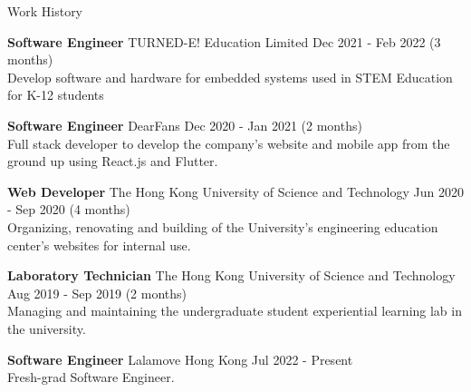 \documentclass{resume} %
\begin{document}
\begin{rSection}{Work History}
    \vspace{-1.25em}
    \item \textbf{Software Engineer} {TURNED-E! Education Limited} \hfill Dec 2021 - Feb 2022 (3 months) \\
    Develop software and hardware for embedded systems used in STEM Education for K-12 students
    \item \textbf{Software Engineer} {DearFans} \hfill Dec 2020 - Jan 2021 (2 months) \\
    Full stack developer to develop the company's website and mobile app from the ground up using React.js and Flutter.
    \item \textbf{Web Developer} {The Hong Kong University of Science and Technology} \hfill Jun 2020 - Sep 2020 (4 months) \\
    Organizing, renovating and building of the University's engineering education center's websites for internal use.
    \item \textbf{Laboratory Technician} {The Hong Kong University of Science and Technology} \hfill Aug 2019 - Sep 2019 (2 months) \\
    Managing and maintaining the undergraduate student experiential learning lab in the university.
    \item \textbf{Software Engineer} {Lalamove Hong Kong} \hfill Jul 2022 - Present \\
    Fresh-grad Software Engineer.
\end{rSection}

\end{document}
